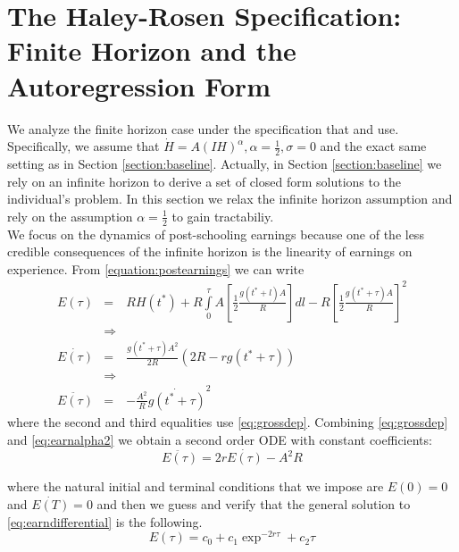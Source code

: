 \section{The Haley-Rosen Specification: Finite Horizon and the Autoregression Form}
We analyze the finite horizon case under the specification that \citet{haley1976estimation} and \citet{rosen1976theory} use. Specifically, we assume that $\dot{H} = A \left( IH \right)^{\alpha}, \alpha = \frac{1}{2}, \sigma = 0$ and the exact same setting as in Section \ref{section:baseline}. Actually, in Section \ref{section:baseline} we rely on an infinite horizon to derive a set of closed form solutions to the individual's problem. In this section we relax the infinite horizon assumption and rely on the assumption $\alpha = \frac{1}{2}$ to gain tractabiliy.\\
\indent We focus on the dynamics of post-schooling earnings because one of the less credible consequences of the infinite horizon is the linearity of earnings on experience. From \eqref{equation:postearnings} we can write
\begin{eqnarray}
E(\tau) &=& RH(t^*) + R \int \limits _{0} ^{\tau} A \left[\frac{1}{2} \frac{g(t^* + l)A}{R} \right]dl - R \left[\frac{1}{2} \frac{g(t^* + \tau)A}{R} \right]^{2} \nonumber \\
&\Rightarrow& \nonumber \\
\dot{E(\tau)} &=& \frac{g (t^* + \tau)A^2}{2R}\left( 2R -rg (t^* + \tau) \right) \nonumber \\
&\Rightarrow& \nonumber \\
\ddot{E(\tau)} &=& -\frac{A^2}{R}\dot{g(t^* + \tau)}^2 \label{eq:earnalpha2}
\end{eqnarray}
where the second and third equalities use \eqref{eq:grossdep}. Combining \eqref{eq:grossdep} and \eqref{eq:earnalpha2} we obtain a second order ODE with constant coefficients:
\begin{equation}
\ddot{E(\tau)} = 2r \dot{E(\tau)} - A^2 R \label{eq:earndifferential}
\end{equation} 

\noindent where the natural initial and terminal conditions that we impose are $E(0)=0$ and $\dot{E(T)} = 0$ and then we guess and verify that the general solution to \eqref{eq:earndifferential} is the following. %
\begin{equation}
E(\tau) = c_{0} + c_{1}\exp^{-2r \tau} + c_{2} \tau
\end{equation}

